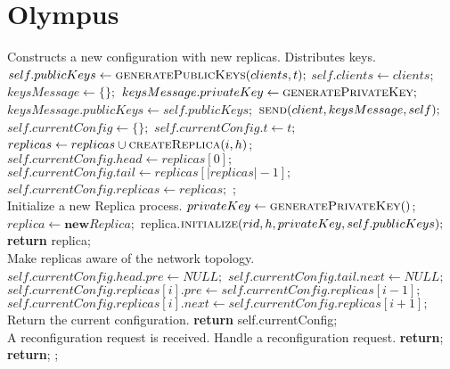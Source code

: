 \section{Olympus}

\begin{algorithmic}[1] 
 \Comment Constructs a new configuration with new replicas. Distributes keys.
    \State $self.publicKeys\gets \Call{generatePublicKeys}{clients, t};$
	\State $self.clients\gets clients;$
    	\State $keysMessage\gets \{\};$
        \State $keysMessage.privateKey\gets \Call{generatePrivateKey}{};$
    	\State $keysMessage.publicKeys\gets self.publicKeys;$
        \State $\Call{send}{client, keysMessage, self};$
    \EndFor
	\State $self.currentConfig\gets \{\};$
	\State $self.currentConfig.t\gets t;$
		\State $replicas\gets replicas \cup \Call{createReplica}{i, h}$;
    \EndFor
    \State $self.currentConfig.head\gets replicas[0];$
    \State $self.currentConfig.tail\gets replicas[|replicas| - 1];$
    \State $self.currentConfig.replicas\gets replicas;$
    \State {};
\EndFunction
\\

 \Comment Initialize a new Replica process.
    \State $privateKey\gets \Call{generatePrivateKey}$;
    \State $replica\gets \textbf{new} Replica;$
    \State replica.$\Call{initialize}{rid, h, privateKey, self.publicKeys};$
    \State \textbf{return} replica;
\EndFunction
\\

 \Comment Make replicas aware of the network topology.
	\State $self.currentConfig.head.pre\gets NULL;$
    \State $self.currentConfig.tail.next\gets NULL;$
    	\State $self.currentConfig.replicas[i].pre\gets self.currentConfig.replicas[i - 1];$
    	\State $self.currentConfig.replicas[i].next\gets self.currentConfig.replicas[i + 1];$
    \EndFor
\EndFunction
\\

 \Comment Return the current configuration.
	\State \textbf{return} self.currentConfig; 
\EndFunction
\\

\Require A reconfiguration request is received.
 \Comment Handle a reconfiguration request.
        \State \textbf{return};
    	\State \textbf{return};
    \EndIf
	\State {};
\EndFunction
\\


\end{algorithmic}
